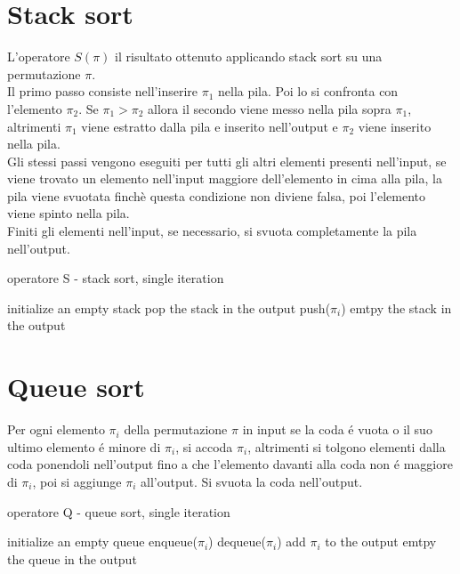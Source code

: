 \section*{Stack sort}
L'operatore $S(\pi)$ il risultato ottenuto applicando stack sort su una permutazione $\pi$.\\
Il primo passo consiste nell'inserire $\pi_1$ nella pila. Poi lo si confronta con l'elemento $\pi_2$. Se $\pi_1>\pi_2$ allora il secondo viene messo nella pila sopra $\pi_1$, altrimenti $\pi_1$ viene estratto dalla pila e inserito nell'output e $\pi_2$ viene inserito nella pila.\\
Gli stessi passi vengono eseguiti per tutti gli altri elementi presenti nell'input, se viene trovato un elemento nell'input maggiore dell'elemento in cima alla pila, la pila viene svuotata finchè questa condizione non diviene falsa, poi l'elemento viene spinto nella pila.\\
Finiti gli elementi nell'input, se necessario, si svuota completamente la pila nell'output.
\begin{algorithm}[H]
   \caption{operatore S - stack sort, single iteration }
\begin{algorithmic}
\State initialize an empty stack
   \State pop the stack in the output
   \EndWhile
   \State push($\pi_i$)
   \EndFor
   \State emtpy the stack in the output
\end{algorithmic}
\end{algorithm}
\section*{Queue sort}
Per ogni elemento $\pi_i$ della permutazione $\pi$ in input se la coda \'e vuota o il suo ultimo elemento \'e minore di $\pi_i$, si accoda $\pi_i$, altrimenti si tolgono elementi dalla coda ponendoli nell'output fino a che l'elemento davanti  alla coda non \'e maggiore di $\pi_i$, poi si aggiunge $\pi_i$ all'output.
Si svuota la coda nell'output. 
\begin{algorithm}[H]
   \caption{operatore Q - queue sort, single iteration }
\begin{algorithmic}
\State initialize an empty queue
\State enqueue($\pi_i$)
\Else
{}
\State dequeue($\pi_i$)
\EndWhile
\State add $\pi_i$ to the output
\EndIf
\EndFor
\State emtpy the queue in the output
\end{algorithmic}
\end{algorithm}
